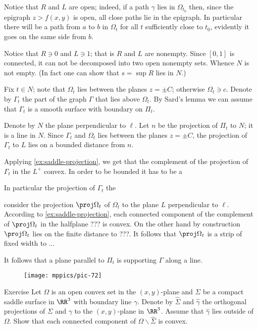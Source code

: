 Notice that $R$ and $L$ are open; indeed, if a path $\gamma$ lies in $\Omega_{t_0}$ then, since the epigraph $z>f(x,y)$ is open, all close paths lie in the epigraph.
In particular there will be a path from $a$ to $b$ in $\Omega_t$ for all $t$ sufficiently close to $t_0$,
evidently it goes on the same side from $b$.

Notice that $R\ni 0$ and $L\ni 1$; that is $R$ and $L$ are nonempty.
Since $[0,1]$ is connected, it can not be decomposed into two open nonempty sets.
Whence $N$ is not empty.
(In fact one can show that $s=\sup R$ lies in $N$.)


Fix $t\in N$; note that $\Omega_t$ lies between the planes $z=\pm C$;
otherwise $\Omega_t\ni c$.
Denote by $\Gamma_t$ the part of the graph $\Gamma$ that lies above $\Omega_t$.
By Sard's lemma we can assume that $\Gamma_t$ is a smooth surface with boundary on $\Pi_t$.

Denote by $N$ the plane perpendicular to $\ell$.
Let $n$ be the projection of $\Pi_t$ to $N$; 
it is a line in $N$.
Since $\Gamma_t$ and $\Omega_t$ lies between the planes $z=\pm C$, the projection of $\Gamma_t$ to $L$ lies on a bounded distance from $n$.

Applying \ref{ex:saddle-projection}, we get that the complement of the projection of $\Gamma_t$ in the $L^+$ convex. 
In order to be bounded it has to be a 


In particular the projection of $\Gamma_t$ the 

consider the projection $\proj\Omega_t$ of $\Omega_t$ to the plane $L$ perpendicular to $\ell$.
According to \ref{ex:saddle-projection},
each connected component of the complement of $\proj\Omega_t$  in the halfplane ??? is convex.
On the other hand by construction $\proj\Omega_t$ lies on the finite distance to ???.
It follows that $\proj\Omega_t$ is a strip of fixed width to ...

It follows that a plane parallel to $\Pi_t$ is supporting $\Gamma$ along a line.

\qeds

\begin{wrapfigure}{o}{40 mm}
\vskip-0mm
\centering
\texttt{[image: mppics/pic-72]}
\vskip0mm
\end{wrapfigure}

\begin{thm}{Exercise}\label{ex:saddle-projection}
Let $\Omega$ is an open convex set in the $(x,y)$-plane and 
$\Sigma$ be a compact saddle surface in $\RR^3$ with boundary line $\gamma$.
Denote by $\hat \Sigma$ and $\hat\gamma$ the orthogonal projections of $\Sigma$ and $\gamma$ to the $(x,y)$-plane in $\RR^3$.
Assume that $\hat\gamma$ lies outside of $\Omega$.
Show that each connected component of $\Omega\backslash \hat\Sigma$ is convex. 
\end{thm}


